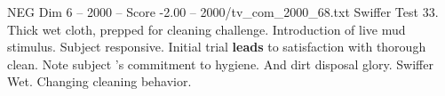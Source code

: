 \begin{textsample}{NEG Dim 6 – 2000 – Score -2.00 – 2000/tv\_com\_2000\_68.txt}  \label{ex:f6_neg_003}
Swiffer Test 33.
Thick wet cloth, prepped for cleaning challenge.
Introduction of live mud stimulus.
Subject responsive.
Initial trial \textbf{leads} to satisfaction with thorough clean.
Note subject 's commitment to hygiene.
And dirt disposal glory.
Swiffer Wet.
Changing cleaning behavior.

\end{textsample}
